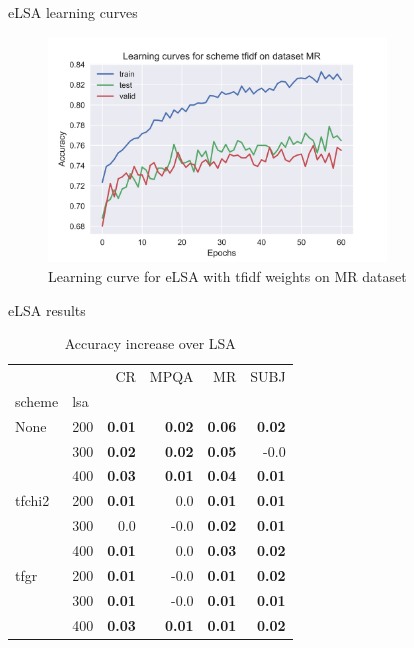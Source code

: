 \documentclass[xcolor={table}]{beamer}
\begin{document}
\begin{frame}{eLSA learning curves}
    \begin{figure}
    \centerline{\includegraphics[width=0.8\textwidth]{learning_curve_MR_tfidf}}
    \caption[Learning curve for eLSA with tfidf weights on MR dataset]{Learning curve for eLSA with tfidf weights on MR dataset}
    \label{img:learning:curve}
    \end{figure}
\end{frame} 

\begin{frame}{eLSA results}
    \small
\begin{table}[H]
\begin{center}

\begin{tabular}{ll|rrrr}
\toprule
   &   &   CR &  MPQA &   MR &  SUBJ \\
scheme & lsa &        &        &        &        \\
\midrule
None & 200 & \textbf{0.01} & \textbf{0.02} & \textbf{0.06} & \textbf{0.02} \\
   & 300 & \textbf{0.02} & \textbf{0.02} & \textbf{0.05} &     -0.0 \\
   & 400 & \textbf{0.03} & \textbf{0.01} & \textbf{0.04} & \textbf{0.01} \\
tfchi2 & 200 & \textbf{0.01} &      0.0 & \textbf{0.01} & \textbf{0.01} \\
   & 300 &      0.0 &     -0.0 & \textbf{0.02} & \textbf{0.01} \\
   & 400 & \textbf{0.01} &      0.0 & \textbf{0.03} & \textbf{0.02} \\
tfgr & 200 & \textbf{0.01} &     -0.0 & \textbf{0.01} & \textbf{0.02} \\
   & 300 & \textbf{0.01} &     -0.0 & \textbf{0.01} & \textbf{0.01} \\
   & 400 & \textbf{0.03} & \textbf{0.01} & \textbf{0.01} & \textbf{0.02} \\
\bottomrule
\end{tabular}

\caption[Accuracy increase over LSA]{Accuracy increase over LSA}
\label{tab:batch:results}
\end{center}
\end{table}
\end{frame}
\end{document}
